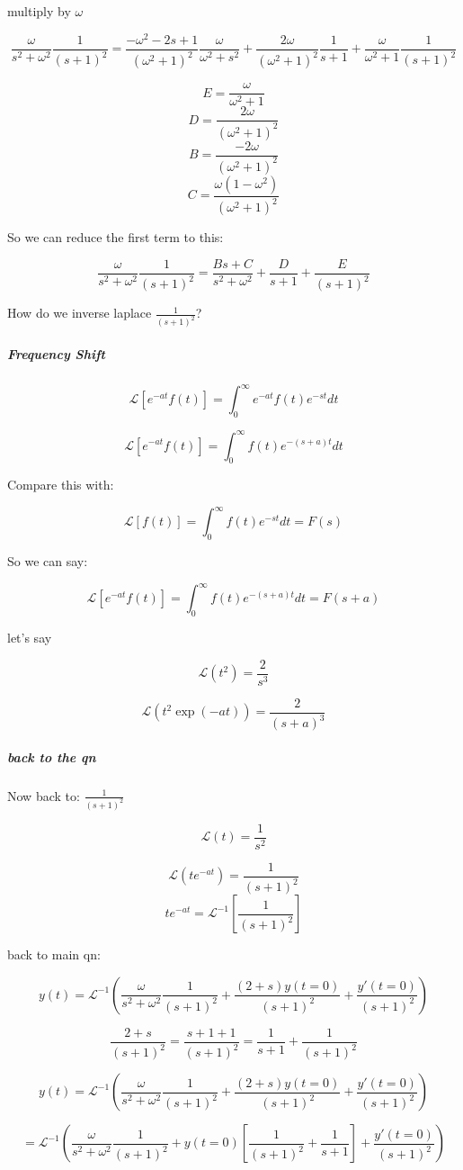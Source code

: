 \documentclass[17pt]{extarticle}
\begin{document}
multiply by $\omega$

$$\frac{\omega}{s^2 + \omega^2} \frac{1}{(s+1)^2} = \frac{-\omega^2 - 2s +1}{(\omega^2+1)^2} \frac{\omega}{\omega^2 + s^2}+ \frac{2\omega}{(\omega^2+1)^2} \frac{1}{s+1} + \frac{\omega}{\omega^2+1} \frac{1}{(s+1)^2}$$


$$E = \frac{\omega}{\omega^2+1}$$
$$D = \frac{2\omega}{(\omega^2+1)^2}$$
$$B = \frac{-2\omega}{(\omega^2+1)^2}$$
$$C = \frac{\omega(1-\omega^2)}{(\omega^2+1)^2}$$

So we can reduce the first term to this:

$$\frac{\omega}{s^2 + \omega^2} \frac{1}{(s+1)^2}  = \frac{Bs + C}{s^2 + \omega^2} + \frac{D}{s+1} + \frac{E}{(s+1)^2} $$


How do we inverse laplace $\frac{1}{(s+1)^2}$?

\subparagraph{Frequency Shift}

$$\mathcal{L}[e^{-at} f(t)] = \int_0^\infty e^{-at} f(t) e^{-st} dt $$

$$\mathcal{L}[e^{-at} f(t)] = \int_0^\infty f(t) e^{-(s+a)t} dt $$

Compare this with:

$$\mathcal{L}[f(t)] = \int_0^\infty f(t) e^{-st} dt = F(s)$$

So we can say:

$$\mathcal{L}[e^{-at} f(t)] = \int_0^\infty f(t) e^{-(s+a)t} dt = F(s+a) $$

let's say

$$\mathcal{L}(t^2)= \frac{2}{s^3}$$

$$\mathcal{L}(t^2 \exp(-at))= \frac{2}{(s+a)^3}$$
\subparagraph{back to the qn}
Now back to: $\frac{1}{(s+1)^2}$

$$\mathcal{L}(t)= \frac{1}{s^2}$$

$$\mathcal{L}(te^{-at})= \frac{1}{(s+1)^2}$$
$$te^{-at}= \mathcal{L}^{-1} \left[ \frac{1}{(s+1)^2} \right]$$

back to main qn:

$$y(t)  = \mathcal{L}^{-1} (\frac{\omega}{s^2 + \omega^2} \frac{1}{(s+1)^2} +  \frac{(2+s) y(t=0) }{(s+1)^2} + \frac{y'(t=0)}{(s+1)^2} )$$

$$\frac{2+s}{(s+1)^2} = \frac{s+1 +1}{(s+1)^2}= \frac{1}{s+1} + \frac{1}{(s+1)^2}$$

$$y(t)  = \mathcal{L}^{-1} (\frac{\omega}{s^2 + \omega^2} \frac{1}{(s+1)^2} +  \frac{(2+s) y(t=0) }{(s+1)^2} + \frac{y'(t=0)}{(s+1)^2} )$$

$$= \mathcal{L}^{-1} \left(\frac{\omega}{s^2 + \omega^2} \frac{1}{(s+1)^2} + y(t=0)\left[ \frac{1  }{(s+1)^2}  + \frac{1}{s+1} \right] + \frac{y'(t=0)}{(s+1)^2} \right)$$
\end{document}
